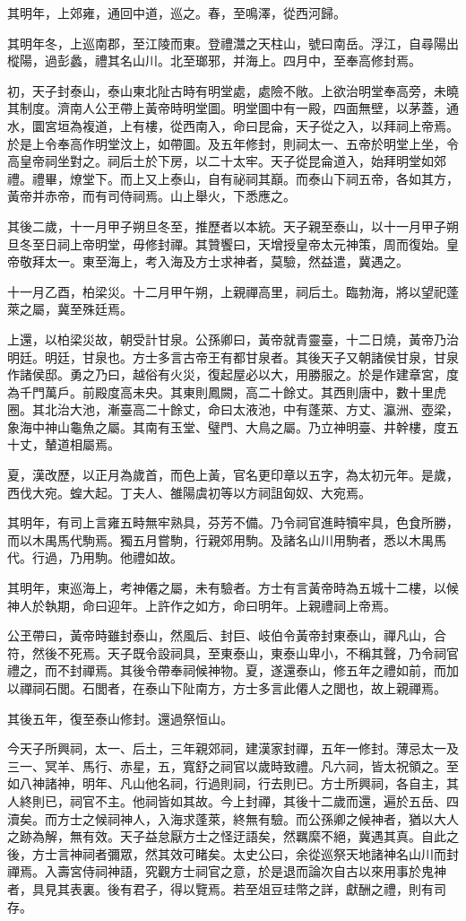 其明年，上郊雍，通回中道，巡之。春，至鳴澤，從西河歸。

其明年冬，上巡南郡，至江陵而東。登禮灊之天柱山，號曰南岳。浮江，自尋陽出樅陽，過彭蠡，禮其名山川。北至瑯邪，并海上。四月中，至奉高修封焉。

初，天子封泰山，泰山東北阯古時有明堂處，處險不敞。上欲治明堂奉高旁，未曉其制度。濟南人公玊帶上黃帝時明堂圖。明堂圖中有一殿，四面無壁，以茅蓋，通水，圜宮垣為複道，上有樓，從西南入，命曰昆侖，天子從之入，以拜祠上帝焉。於是上令奉高作明堂汶上，如帶圖。及五年修封，則祠太一、五帝於明堂上坐，令高皇帝祠坐對之。祠后土於下房，以二十太牢。天子從昆侖道入，始拜明堂如郊禮。禮畢，燎堂下。而上又上泰山，自有祕祠其巔。而泰山下祠五帝，各如其方，黃帝并赤帝，而有司侍祠焉。山上舉火，下悉應之。

其後二歲，十一月甲子朔旦冬至，推歷者以本統。天子親至泰山，以十一月甲子朔旦冬至日祠上帝明堂，毋修封禪。其贊饗曰，天增授皇帝太元神策，周而復始。皇帝敬拜太一。東至海上，考入海及方士求神者，莫驗，然益遣，冀遇之。

十一月乙酉，柏梁災。十二月甲午朔，上親禪高里，祠后土。臨勃海，將以望祀蓬萊之屬，冀至殊廷焉。

上還，以柏梁災故，朝受計甘泉。公孫卿曰，黃帝就青靈臺，十二日燒，黃帝乃治明廷。明廷，甘泉也。方士多言古帝王有都甘泉者。其後天子又朝諸侯甘泉，甘泉作諸侯邸。勇之乃曰，越俗有火災，復起屋必以大，用勝服之。於是作建章宮，度為千門萬戶。前殿度高未央。其東則鳳闕，高二十餘丈。其西則唐中，數十里虎圈。其北治大池，漸臺高二十餘丈，命曰太液池，中有蓬萊、方丈、瀛洲、壺梁，象海中神山龜魚之屬。其南有玉堂、璧門、大鳥之屬。乃立神明臺、井幹樓，度五十丈，輦道相屬焉。

夏，漢改歷，以正月為歲首，而色上黃，官名更印章以五字，為太初元年。是歲，西伐大宛。蝗大起。丁夫人、雒陽虞初等以方祠詛匈奴、大宛焉。

其明年，有司上言雍五畤無牢熟具，芬芳不備。乃令祠官進畤犢牢具，色食所勝，而以木禺馬代駒焉。獨五月嘗駒，行親郊用駒。及諸名山川用駒者，悉以木禺馬代。行過，乃用駒。他禮如故。

其明年，東巡海上，考神僊之屬，未有驗者。方士有言黃帝時為五城十二樓，以候神人於執期，命曰迎年。上許作之如方，命曰明年。上親禮祠上帝焉。

公玊帶曰，黃帝時雖封泰山，然風后、封巨、岐伯令黃帝封東泰山，禪凡山，合符，然後不死焉。天子既令設祠具，至東泰山，東泰山卑小，不稱其聲，乃令祠官禮之，而不封禪焉。其後令帶奉祠候神物。夏，遂還泰山，修五年之禮如前，而加以禪祠石閭。石閭者，在泰山下阯南方，方士多言此僊人之閭也，故上親禪焉。

其後五年，復至泰山修封。還過祭恒山。

今天子所興祠，太一、后土，三年親郊祠，建漢家封禪，五年一修封。薄忌太一及三一、冥羊、馬行、赤星，五，寬舒之祠官以歲時致禮。凡六祠，皆太祝領之。至如八神諸神，明年、凡山他名祠，行過則祠，行去則已。方士所興祠，各自主，其人終則已，祠官不主。他祠皆如其故。今上封禪，其後十二歲而還，遍於五岳、四瀆矣。而方士之候祠神人，入海求蓬萊，終無有驗。而公孫卿之候神者，猶以大人之跡為解，無有效。天子益怠厭方士之怪迂語矣，然羈縻不絕，冀遇其真。自此之後，方士言神祠者彌眾，然其效可睹矣。太史公曰，余從巡祭天地諸神名山川而封禪焉。入壽宮侍祠神語，究觀方士祠官之意，於是退而論次自古以來用事於鬼神者，具見其表裏。後有君子，得以覽焉。若至俎豆珪幣之詳，獻酬之禮，則有司存。